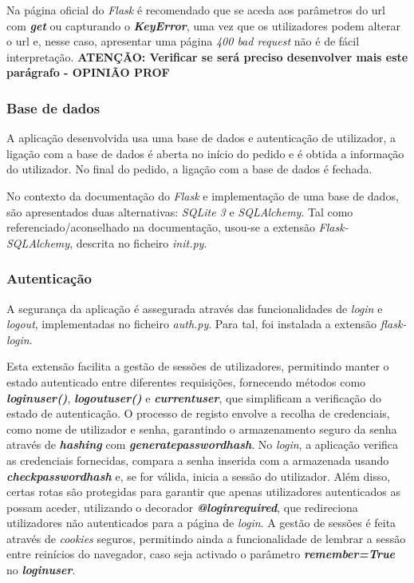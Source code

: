 Na página oficial do \textit{Flask} é recomendado que se aceda aos parâmetros do \acrshort{url} com \textit{\textbf{get}} ou capturando o \textit{\textbf{KeyError}}, uma vez que os utilizadores podem alterar o \acrshort{url} e, nesse caso, apresentar uma página \textit{400 bad request} não é de fácil interpretação. \textbf{ATENÇÃO: Verificar se será preciso desenvolver mais este parágrafo - OPINIÃO PROF}

\subsubsection{Base de dados}
A aplicação desenvolvida usa uma base de dados e autenticação de utilizador, a ligação com a base de dados é aberta no início do pedido e é obtida a informação do utilizador. No final do pedido, a ligação com a base de dados é fechada.

No contexto da documentação do \textit{Flask} e implementação de uma base de dados, são apresentados duas alternativas: \textit{SQLite 3} e \textit{SQLAlchemy}. Tal como referenciado/aconselhado na documentação, usou-se a extensão \textit{Flask-SQLAlchemy}, descrita no ficheiro \textit{\textunderscore\textunderscore init.py\textunderscore\textunderscore}.

\subsubsection{Autenticação}
A segurança da aplicação é assegurada através das funcionalidades de \textit{login} e \textit{logout}, implementadas no ficheiro \textit{auth.py}. Para tal, foi instalada a extensão \textit{flask-login}.

Esta extensão facilita a gestão de sessões de utilizadores, permitindo manter o estado autenticado entre diferentes requisições, fornecendo métodos como \textbf{\textit{login\textunderscore user()}}, \textbf{\textit{logout\textunderscore user()}} e \textbf{\textit{current\textunderscore user}}, que simplificam a verificação do estado de autenticação. O processo de registo envolve a recolha de credenciais, como nome de utilizador e senha, garantindo o armazenamento seguro da senha através de \textbf{\textit{hashing}} com \textbf{\textit{generate\textunderscore password\textunderscore hash}}. No \textit{login}, a aplicação verifica as credenciais fornecidas, compara a senha inserida com a armazenada usando \textbf{\textit{check\textunderscore password\textunderscore hash}} e, se for válida, inicia a sessão do utilizador. Além disso, certas rotas são protegidas para garantir que apenas utilizadores autenticados as possam aceder, utilizando o decorador \textbf{\textit{@login\textunderscore required}}, que redireciona utilizadores não autenticados para a página de \textit{login}. A gestão de sessões é feita através de \textit{cookies} seguros, permitindo ainda a funcionalidade de lembrar a sessão entre reinícios do navegador, caso seja activado o parâmetro \textbf{\textit{remember=True}} no \textbf{\textit{login\textunderscore user}}. 

